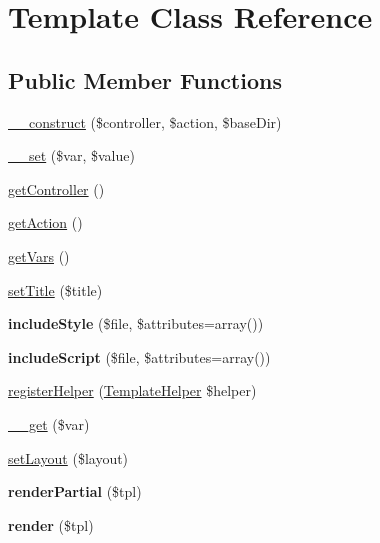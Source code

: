 \hypertarget{class_template}{\section{\-Template \-Class \-Reference}
\label{class_template}
}
\subsection*{\-Public \-Member \-Functions}
\begin{DoxyCompactItemize}
\item 
\hyperlink{class_template_ac48173c3260cdbf4b386fab14485b89e}{\-\_\-\-\_\-construct} (\$controller, \$action, \$base\-Dir)
\item 
\hyperlink{class_template_a80acb31779de572d8186d1cc10c8c9db}{\-\_\-\-\_\-set} (\$var, \$value)
\item 
\hyperlink{class_template_aa8b89e0bad51878addc1300cd3e95b5c}{get\-Controller} ()
\item 
\hyperlink{class_template_a189a4abe5faf11f4320d5d3f1d3d1715}{get\-Action} ()
\item 
\hyperlink{class_template_ab81a1d1cef7f7d6c406e60bd368f94af}{get\-Vars} ()
\item 
\hyperlink{class_template_a884ba9bb0d54bde7839e798db7964476}{set\-Title} (\$title)
\item 
\hypertarget{class_template_ae3c188ddb33787c74fdaf283c9f5ee16}{{\bfseries include\-Style} (\$file, \$attributes=array())}\label{class_template_ae3c188ddb33787c74fdaf283c9f5ee16}

\item 
\hypertarget{class_template_a631dfe2fc59259e84f647803acf685fb}{{\bfseries include\-Script} (\$file, \$attributes=array())}\label{class_template_a631dfe2fc59259e84f647803acf685fb}

\item 
\hyperlink{class_template_acd0ce6eade228a04fb8974811d1056a7}{register\-Helper} (\hyperlink{interface_template_helper}{\-Template\-Helper} \$helper)
\item 
\hyperlink{class_template_a8fb2d9cdca17b87400e780b9f9720933}{\-\_\-\-\_\-get} (\$var)
\item 
\hyperlink{class_template_a702b3376618a26e6c02c05bae65c6b9e}{set\-Layout} (\$layout)
\item 
\hypertarget{class_template_aad732d37f54d4a4315ae2f9d8f92a4d3}{{\bfseries render\-Partial} (\$tpl)}\label{class_template_aad732d37f54d4a4315ae2f9d8f92a4d3}

\item 
\hypertarget{class_template_a200b07b91933efe213c09aa4ae511679}{{\bfseries render} (\$tpl)}\label{class_template_a200b07b91933efe213c09aa4ae511679}

\end{DoxyCompactItemize}


